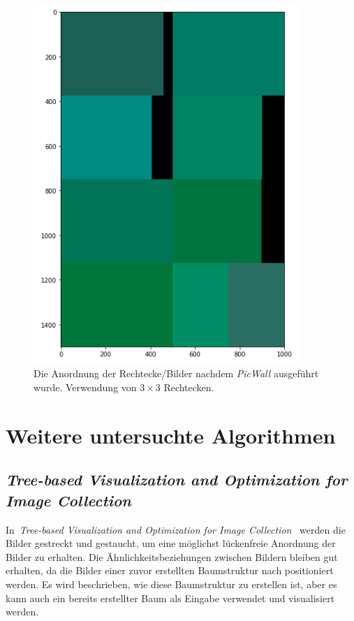 \documentclass[12pt, ngerman, utf8]{article}
\begin{document}
\begin{figure}[h]
\begin{minipage}{.45\textwidth}
  \includegraphics[width=0.9\textwidth]{./imgs/picwall-vis-small.png}
  \caption{Die Anordnung der Rechtecke/Bilder nachdem \textit{PicWall} ausgeführt wurde. Verwendung von $3 \times 3$ Rechtecken.}
  \label{fig:picwall-vis-3}
\end{minipage}
\end{figure}

\section{Weitere untersuchte Algorithmen}\label{sec:weiter-algs}

\subsection{\emph{Tree-based Visualization and Optimization for Image Collection}}
In \emph{Tree-based Visualization and Optimization for Image Collection} \cite{treebased-vis} werden die Bilder gestreckt und gestaucht, um eine möglichst lückenfreie Anordnung der Bilder zu erhalten. Die Ähnlichkeitsbeziehungen zwischen Bildern bleiben gut erhalten, da die Bilder einer zuvor erstellten Baumstruktur nach positioniert werden. Es wird beschrieben, wie diese Baumstruktur zu erstellen ist, aber es kann auch ein bereits erstellter Baum als Eingabe verwendet und visualisiert werden.
\end{document}
